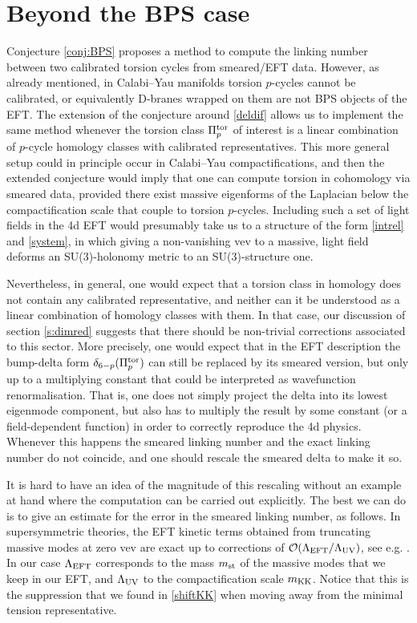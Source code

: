 \documentclass[11pt]{article}
\begin{document}

\section{Beyond the BPS case}
\label{s:nonBPS}

Conjecture \ref{conj:BPS} proposes a method to compute the linking number between two calibrated torsion cycles from smeared/EFT data. However, as already mentioned, in Calabi--Yau manifolds torsion $p$-cycles cannot be calibrated, or equivalently D-branes wrapped on them are not BPS objects of the EFT. The extension of the conjecture around \eqref{deldif} allows us to implement the same method whenever the torsion class $\Pi_p^{\rm tor}$ of interest is a linear combination of $p$-cycle homology classes with calibrated representatives. This more general setup could in principle occur in Calabi--Yau compactifications, and then the extended conjecture would imply that one can compute torsion in cohomology via smeared data, provided there exist massive eigenforms of the Laplacian below the compactification scale that couple to torsion $p$-cycles. Including such a set of light fields in the 4d EFT would presumably take us to a structure of the form \eqref{intrel} and \eqref{system}, in which giving a non-vanishing vev to a massive, light field deforms an SU(3)-holonomy metric to an SU(3)-structure one.  

Nevertheless, in general, one would expect that a torsion class in homology does not contain any calibrated representative, and neither can it be understood as a linear combination of homology classes with them. In that case, our discussion of section \ref{s:dimred} suggests that there should be non-trivial corrections  associated to this sector. More precisely, one would expect that in the EFT description the bump-delta form $\delta_{6-p} (\Pi_p^{\rm tor})$ can still be replaced by its smeared version, but only  up to a multiplying constant that could be interpreted as  wavefunction renormalisation. That is, one does not simply project the delta into its lowest eigenmode component, but also has to multiply the result by some constant (or a field-dependent function) in order to correctly reproduce the 4d physics. Whenever this happens the smeared linking number and the exact linking number do not coincide, and one should rescale the smeared delta to make it so. 

It is hard to have an idea of the magnitude of this rescaling without an  example at hand where the computation can be carried out explicitly. The best we can do is to give an estimate for the error in the smeared linking number, as follows. In supersymmetric theories, the EFT kinetic terms obtained from truncating  massive modes at zero vev are exact up to corrections of ${\cal O}(\Lambda_{\rm EFT}/\Lambda_{\rm UV})$, see e.g. \cite{Buchmuller:2014vda}. In our case $\Lambda_{\rm EFT}$ corresponds to the mass $m_{\rm st}$ of the massive modes that we keep in our EFT, and $\Lambda_{\rm UV}$ to the compactification scale $m_{\rm KK}$. Notice that this is the suppression that we found in \eqref{shiftKK} when moving away from the minimal tension representative. 
\end{document}
